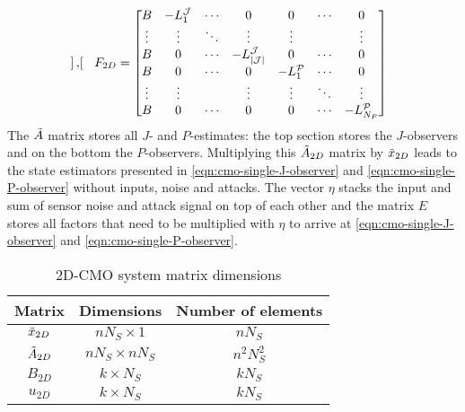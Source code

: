 \begin{equation}
\begin{split}
\begin{bmatrix}
        \end{bmatrix}, \quad 
        F_{2D} = 
        \begin{bmatrix}
            B & -L_1^{\mathcal{J}} & \cdots & 0 & 0 & \cdots & 0 \\
            \vdots & \vdots & \ddots & \vdots & \vdots & & \vdots \\
            B & 0 & \cdots & -L_{|\mathcal{J}|}^{\mathcal{J}} & 0 & \cdots & 0 \\
            B & 0 & \cdots & 0 & -L_{1}^{\mathcal{P}} & \cdots & 0 \\
            \vdots & \vdots & & \vdots & \vdots & \ddots & \vdots \\
            B & 0 & \cdots & 0 & 0 & \cdots & -L_{N_P}^{\mathcal{P}} \\
        \end{bmatrix}\\
    \end{split}
\end{equation}
The $\Tilde{A}$ matrix stores  all $J$- and $P$-estimates: the top section stores the $J$-observers and on the bottom the $P$-observers. Multiplying this $\Tilde{A}_{2D}$ matrix by $\Tilde{x}_{2D}$ leads to the state estimators presented in \eqref{eqn:cmo-single-J-observer} and \eqref{eqn:cmo-single-P-observer} without inputs, noise and attacks. The vector $\eta$ stacks the input and sum of sensor noise and attack signal on top of each other and the matrix $E$ stores all factors that need to be multiplied with $\eta$ to arrive at \eqref{eqn:cmo-single-J-observer} and \eqref{eqn:cmo-single-P-observer}.

\newcommand{\ntwoD}{nN_S}
\begin{table}[h]
    \centering
    \begin{tabular}{c|c|c}
       Matrix  & Dimensions & Number of elements \\ \hline
       $\Tilde{x}_{2D}$  & $\ntwoD \times 1$ & $nN_S$ \\
       $\Tilde{A}_{2D}$ & $\ntwoD \times \ntwoD$ & $n^2N_S^2$ \\
       $B_{2D}$ & $k \times N_S$ & $kN_S$ \\
       $u_{2D}$ & $k \times N_S$ & $kN_S$ \\
    \end{tabular}
    \caption{2D-CMO system matrix dimensions}
    \label{tab:2D-CMO-dimensions}
\end{table}



\newpage
